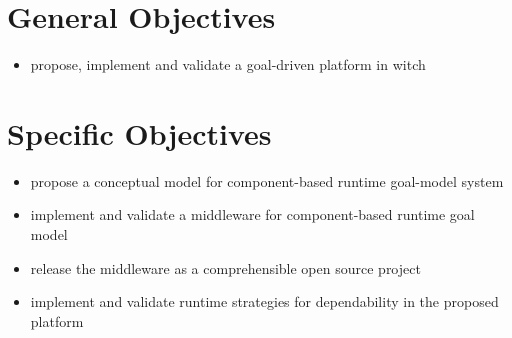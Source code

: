\section{General Objectives}
\begin{itemize}
  \item propose, implement and validate a goal-driven platform in witch
\end{itemize}

\section{Specific Objectives}
\begin{itemize}
  \item propose a conceptual model for component-based runtime goal-model system
  \item implement and validate a middleware for component-based runtime goal model
  \item release the middleware as a comprehensible open source project
  \item implement and validate runtime strategies for dependability in the proposed platform
\end{itemize}
